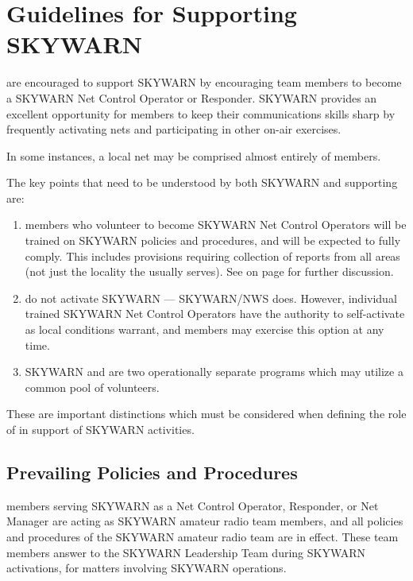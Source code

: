 \documentclass[pdflatex,letterpaper,twoside,12pt]{book}
\begin{document}

\section{Guidelines for \tpteams Supporting SKYWARN}


\tpteams are encouraged to support SKYWARN by encouraging team members to become a SKYWARN Net Control Operator or Responder.  SKYWARN provides an excellent opportunity for \tpteam members to keep their communications skills sharp by frequently activating nets and participating in other on-air exercises.

In some instances, a local net may be comprised almost entirely of \tpteam members.

The key points that need to be understood by both SKYWARN and supporting \tpteams are:

\begin{enumerate}
\item \tpteam members who volunteer to become SKYWARN Net Control Operators will be trained on SKYWARN policies and procedures, and will be expected to fully comply.  This includes provisions requiring collection of reports from all areas (not just the locality the \tpteam usually serves).  See  on page \pageref{sponsorship-of-nets} for further discussion.
\item  \tpteams do not activate SKYWARN --- SKYWARN/NWS does.  However, individual trained SKYWARN Net Control Operators have the authority to self-activate as local conditions warrant, and \tpteam members may exercise this option at any time.
\item  SKYWARN and \tpteams are two operationally separate programs which may utilize a common pool of volunteers.
\end{enumerate}

These are important distinctions which must be considered when defining the role of \tpteams in support of SKYWARN activities.

\subsection{Prevailing Policies and Procedures}

\tpteam members serving SKYWARN as a Net Control Operator, Responder, or Net Manager are acting as SKYWARN amateur radio team members, and all policies and procedures of the SKYWARN amateur radio team are in effect.  These team members answer to the SKYWARN Leadership Team during SKYWARN activations, for matters involving SKYWARN operations.
\end{document}
